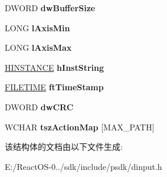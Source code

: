 \begin{DoxyCompactItemize}
\item 
\mbox{\label{struct___d_i_a_c_t_i_o_n_f_o_r_m_a_t_w_a3dd59991b7a558c12ba2e1d4f1ec9800}} 
D\+W\+O\+RD {\bfseries dw\+Buffer\+Size}
\item 
\mbox{\label{struct___d_i_a_c_t_i_o_n_f_o_r_m_a_t_w_a7354858268c222886b72a524066e8945}} 
L\+O\+NG {\bfseries l\+Axis\+Min}
\item 
\mbox{\label{struct___d_i_a_c_t_i_o_n_f_o_r_m_a_t_w_aee3986f7dc5dd85a79203ead21aae544}} 
L\+O\+NG {\bfseries l\+Axis\+Max}
\item 
\mbox{\label{struct___d_i_a_c_t_i_o_n_f_o_r_m_a_t_w_a0213d1583aa2efff66c60ad3d7443d31}} 
\hyperlink{interfacevoid}{H\+I\+N\+S\+T\+A\+N\+CE} {\bfseries h\+Inst\+String}
\item 
\mbox{\label{struct___d_i_a_c_t_i_o_n_f_o_r_m_a_t_w_a625dcc3552abd77fa8da36ad7f120b4b}} 
\hyperlink{struct___f_i_l_e_t_i_m_e}{F\+I\+L\+E\+T\+I\+ME} {\bfseries ft\+Time\+Stamp}
\item 
\mbox{\label{struct___d_i_a_c_t_i_o_n_f_o_r_m_a_t_w_aee1fe8223c171177d004449104d400f1}} 
D\+W\+O\+RD {\bfseries dw\+C\+RC}
\item 
\mbox{\label{struct___d_i_a_c_t_i_o_n_f_o_r_m_a_t_w_a93b4fd7ad1b6916a3d5f00e379ecc2ce}} 
W\+C\+H\+AR {\bfseries tsz\+Action\+Map} \mbox{[}M\+A\+X\+\_\+\+P\+A\+TH\mbox{]}
\end{DoxyCompactItemize}


该结构体的文档由以下文件生成\+:\begin{DoxyCompactItemize}
\item 
E\+:/\+React\+O\+S-\/0../sdk/include/psdk/dinput.\+h\end{DoxyCompactItemize}
